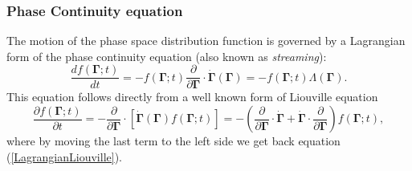 \documentclass[a4paper,12pt]{article}
\begin{document}
\subsubsection{Phase Continuity equation}



The motion of the phase space distribution function is governed by a Lagrangian form of the phase continuity equation (also known as \textit{streaming}):
\begin{equation}
\label{LagrangianLiouville}
  \frac{df(\bm{\Gamma};t)}{dt}=-f(\bm{\Gamma};t)\frac{\partial}{\partial \bm{\Gamma}} \cdot \dot{\bm{\Gamma}}(\bm{\Gamma}) = -f(\bm{\Gamma};t)\Lambda(\bm{\Gamma}).
\end{equation}
This equation follows directly from a well known form of Liouville equation
\begin{equation}
    \frac{\partial f(\bm{\Gamma};t) }{\partial t}
    = -\frac{\partial}{\partial \bm{\Gamma}} \cdot [\dot{\bm{\Gamma}}(\bm{\Gamma}) f(\bm{\Gamma};t)]
     = -(\frac{\partial}{\partial \bm{\Gamma}} \cdot \dot{\bm{\Gamma}} + \dot{\bm{\Gamma}} \cdot \frac{\partial}{\partial \bm{\Gamma}}) f(\bm{\Gamma};t),
\end{equation}
where by moving the last term to the left side we get back equation (\ref{LagrangianLiouville}).

\end{document}
